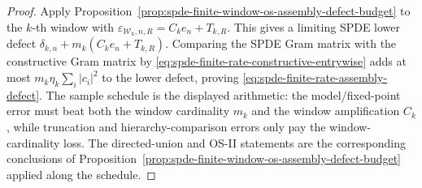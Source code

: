 \begin{proof}
Apply Proposition~\ref{prop:spde-finite-window-os-assembly-defect-budget} to
the \(k\)-th window with
\(\varepsilon_{\mathcal W_k,n,R}=C_k e_n+T_{k,R}\).  This gives a limiting
SPDE lower defect
\(\delta_{k,n}+m_k(C_k e_n+T_{k,R})\).  Comparing the SPDE Gram matrix with the
constructive Gram matrix by
\eqref{eq:spde-finite-rate-constructive-entrywise} adds at most
\(m_k\eta_k\sum_i|c_i|^2\) to the lower defect, proving
\eqref{eq:spde-finite-rate-assembly-defect}.  The sample schedule is the
displayed arithmetic: the model/fixed-point error must beat both the window
cardinality \(m_k\) and the window amplification \(C_k\), while truncation and
hierarchy-comparison errors only pay the window-cardinality loss.  The
directed-union and OS-II statements are the corresponding conclusions of
Proposition~\ref{prop:spde-finite-window-os-assembly-defect-budget} applied
along the schedule.
\end{proof}

